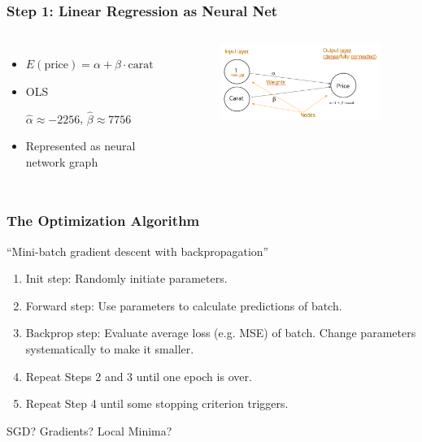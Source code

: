 \documentclass[
    utf8,
    aspectratio=169
]{beamer}  %
\begin{document}
\begin{frame}
	\frametitle{Step 1: Linear Regression as Neural Net}
	\begin{columns}
		\begin{itemize}
			\item $E(\text{price})=\alpha+\beta \cdot \text{carat}$
			\item OLS 
			
			$\hat\alpha \approx -2256$, $\hat\beta \approx 7756$
			\item Represented as neural network graph
		\end{itemize}
		\begin{example}
		\end{example}
		\begin{figure}
		\includegraphics[width=0.98\textwidth]{pics/simple_nn.png}
	\end{figure}
	\end{columns}
\end{frame}

\begin{frame}
\frametitle{The Optimization Algorithm}
\begin{block}{``Mini-batch gradient descent with \alert{backpropagation}''}
	\begin{enumerate}
		\item Init step: Randomly initiate parameters.
		\item Forward step: Use parameters to calculate predictions of \alert{batch}.
		\item Backprop step: Evaluate \alert{average loss} (e.g. MSE) of batch. Change parameters systematically to make it smaller.
		\item Repeat Steps 2 and 3 until one \alert{epoch} is over.
		\item Repeat Step 4 until some stopping criterion triggers.
	\end{enumerate}
\end{block}
SGD? Gradients? Local Minima?
\end{frame}
\end{document}
